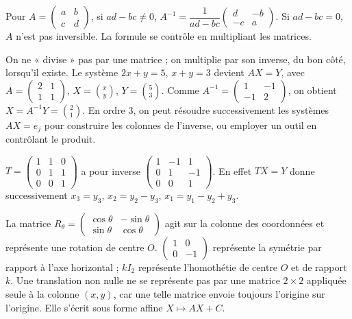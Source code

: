 \begin{propriete}[Ordre $2$]
Pour $A=\begin{pmatrix}a&b\\c&d\end{pmatrix}$, si $ad-bc\ne0$,
$A^{-1}=\dfrac1{ad-bc}\begin{pmatrix}d&-b\\-c&a\end{pmatrix}$.
Si $ad-bc=0$, $A$ n'est pas inversible. La formule se contrôle en multipliant les matrices.
\end{propriete}
On ne « divise » pas par une matrice ; on multiplie par son inverse, du bon côté, lorsqu'il existe.
Le système $2x+y=5$, $x+y=3$ devient
$AX=Y$, avec $A=\begin{pmatrix}2&1\\1&1\end{pmatrix}$, $X=\binom xy$, $Y=\binom53$.
Comme $A^{-1}=\begin{pmatrix}1&-1\\-1&2\end{pmatrix}$, on obtient $X=A^{-1}Y=\binom21$.
En ordre $3$, on peut résoudre successivement les systèmes $AX=e_j$ pour construire les colonnes de l'inverse, ou employer un outil en contrôlant le produit.
\begin{exemple}
$T=\begin{pmatrix}1&1&0\\0&1&1\\0&0&1\end{pmatrix}$ a pour inverse
$\begin{pmatrix}1&-1&1\\0&1&-1\\0&0&1\end{pmatrix}$.
En effet $TX=Y$ donne successivement $x_3=y_3$, $x_2=y_2-y_3$, $x_1=y_1-y_2+y_3$.
\end{exemple}
La matrice $R_\theta=\begin{pmatrix}\cos\theta&-\sin\theta\\\sin\theta&\cos\theta\end{pmatrix}$ agit sur la colonne des coordonnées et représente une rotation de centre $O$.
$\begin{pmatrix}1&0\\0&-1\end{pmatrix}$ représente la symétrie par rapport à l'axe horizontal ; $kI_2$ représente l'homothétie de centre $O$ et de rapport $k$.
Une translation non nulle ne se représente pas par une matrice $2\times2$ appliquée seule à la colonne $(x,y)$, car une telle matrice envoie toujours l'origine sur l'origine. Elle s'écrit sous forme affine $X\mapsto AX+C$.

